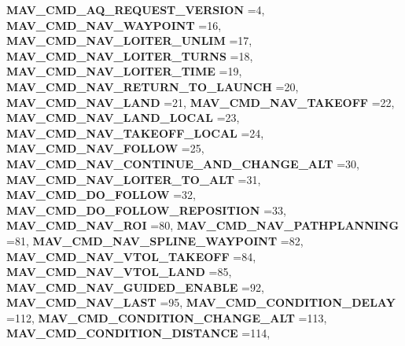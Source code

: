 \begin{DoxyCompactItemize}
\textbf{ M\+A\+V\+\_\+\+C\+M\+D\+\_\+\+A\+Q\+\_\+\+R\+E\+Q\+U\+E\+S\+T\+\_\+\+V\+E\+R\+S\+I\+ON} =4, 
\newline
\textbf{ M\+A\+V\+\_\+\+C\+M\+D\+\_\+\+N\+A\+V\+\_\+\+W\+A\+Y\+P\+O\+I\+NT} =16, 
\textbf{ M\+A\+V\+\_\+\+C\+M\+D\+\_\+\+N\+A\+V\+\_\+\+L\+O\+I\+T\+E\+R\+\_\+\+U\+N\+L\+IM} =17, 
\textbf{ M\+A\+V\+\_\+\+C\+M\+D\+\_\+\+N\+A\+V\+\_\+\+L\+O\+I\+T\+E\+R\+\_\+\+T\+U\+R\+NS} =18, 
\textbf{ M\+A\+V\+\_\+\+C\+M\+D\+\_\+\+N\+A\+V\+\_\+\+L\+O\+I\+T\+E\+R\+\_\+\+T\+I\+ME} =19, 
\newline
\textbf{ M\+A\+V\+\_\+\+C\+M\+D\+\_\+\+N\+A\+V\+\_\+\+R\+E\+T\+U\+R\+N\+\_\+\+T\+O\+\_\+\+L\+A\+U\+N\+CH} =20, 
\textbf{ M\+A\+V\+\_\+\+C\+M\+D\+\_\+\+N\+A\+V\+\_\+\+L\+A\+ND} =21, 
\textbf{ M\+A\+V\+\_\+\+C\+M\+D\+\_\+\+N\+A\+V\+\_\+\+T\+A\+K\+E\+O\+FF} =22, 
\textbf{ M\+A\+V\+\_\+\+C\+M\+D\+\_\+\+N\+A\+V\+\_\+\+L\+A\+N\+D\+\_\+\+L\+O\+C\+AL} =23, 
\newline
\textbf{ M\+A\+V\+\_\+\+C\+M\+D\+\_\+\+N\+A\+V\+\_\+\+T\+A\+K\+E\+O\+F\+F\+\_\+\+L\+O\+C\+AL} =24, 
\textbf{ M\+A\+V\+\_\+\+C\+M\+D\+\_\+\+N\+A\+V\+\_\+\+F\+O\+L\+L\+OW} =25, 
\textbf{ M\+A\+V\+\_\+\+C\+M\+D\+\_\+\+N\+A\+V\+\_\+\+C\+O\+N\+T\+I\+N\+U\+E\+\_\+\+A\+N\+D\+\_\+\+C\+H\+A\+N\+G\+E\+\_\+\+A\+LT} =30, 
\textbf{ M\+A\+V\+\_\+\+C\+M\+D\+\_\+\+N\+A\+V\+\_\+\+L\+O\+I\+T\+E\+R\+\_\+\+T\+O\+\_\+\+A\+LT} =31, 
\newline
\textbf{ M\+A\+V\+\_\+\+C\+M\+D\+\_\+\+D\+O\+\_\+\+F\+O\+L\+L\+OW} =32, 
\textbf{ M\+A\+V\+\_\+\+C\+M\+D\+\_\+\+D\+O\+\_\+\+F\+O\+L\+L\+O\+W\+\_\+\+R\+E\+P\+O\+S\+I\+T\+I\+ON} =33, 
\textbf{ M\+A\+V\+\_\+\+C\+M\+D\+\_\+\+N\+A\+V\+\_\+\+R\+OI} =80, 
\textbf{ M\+A\+V\+\_\+\+C\+M\+D\+\_\+\+N\+A\+V\+\_\+\+P\+A\+T\+H\+P\+L\+A\+N\+N\+I\+NG} =81, 
\newline
\textbf{ M\+A\+V\+\_\+\+C\+M\+D\+\_\+\+N\+A\+V\+\_\+\+S\+P\+L\+I\+N\+E\+\_\+\+W\+A\+Y\+P\+O\+I\+NT} =82, 
\textbf{ M\+A\+V\+\_\+\+C\+M\+D\+\_\+\+N\+A\+V\+\_\+\+V\+T\+O\+L\+\_\+\+T\+A\+K\+E\+O\+FF} =84, 
\textbf{ M\+A\+V\+\_\+\+C\+M\+D\+\_\+\+N\+A\+V\+\_\+\+V\+T\+O\+L\+\_\+\+L\+A\+ND} =85, 
\textbf{ M\+A\+V\+\_\+\+C\+M\+D\+\_\+\+N\+A\+V\+\_\+\+G\+U\+I\+D\+E\+D\+\_\+\+E\+N\+A\+B\+LE} =92, 
\newline
\textbf{ M\+A\+V\+\_\+\+C\+M\+D\+\_\+\+N\+A\+V\+\_\+\+L\+A\+ST} =95, 
\textbf{ M\+A\+V\+\_\+\+C\+M\+D\+\_\+\+C\+O\+N\+D\+I\+T\+I\+O\+N\+\_\+\+D\+E\+L\+AY} =112, 
\textbf{ M\+A\+V\+\_\+\+C\+M\+D\+\_\+\+C\+O\+N\+D\+I\+T\+I\+O\+N\+\_\+\+C\+H\+A\+N\+G\+E\+\_\+\+A\+LT} =113, 
\textbf{ M\+A\+V\+\_\+\+C\+M\+D\+\_\+\+C\+O\+N\+D\+I\+T\+I\+O\+N\+\_\+\+D\+I\+S\+T\+A\+N\+CE} =114, 

\end{DoxyCompactItemize}
